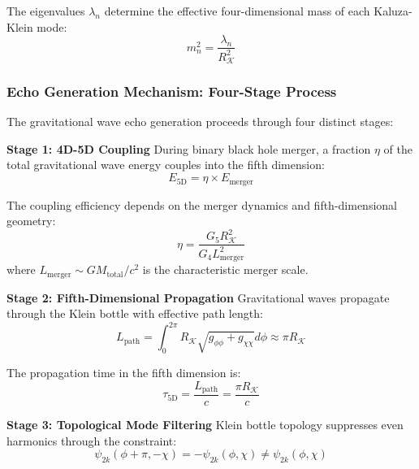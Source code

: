 \documentclass[reprint,amsmath,amssymb,aps,prd]{revtex4-2}
\newcommand{\Klein}{\mathcal{K}}
\newcommand{\KleinRadius}{R_\Klein}
\begin{document}
The eigenvalues $\lambda_n$ determine the effective four-dimensional mass of each Kaluza-Klein mode:
\begin{equation}
m_n^2 = \frac{\lambda_n}{\KleinRadius^2}
\label{eq:kk_mass}
\end{equation}

\subsubsection{Echo Generation Mechanism: Four-Stage Process}

The gravitational wave echo generation proceeds through four distinct stages:

\textbf{Stage 1: 4D-5D Coupling}
During binary black hole merger, a fraction $\eta$ of the total gravitational wave energy couples into the fifth dimension:
\begin{equation}
E_{\text{5D}} = \eta \times E_{\text{merger}}
\label{eq:coupling_energy}
\end{equation}

The coupling efficiency depends on the merger dynamics and fifth-dimensional geometry:
\begin{equation}
\eta = \frac{G_5 \KleinRadius^2}{G_4 L_{\text{merger}}^2}
\label{eq:coupling_efficiency}
\end{equation}
where $L_{\text{merger}} \sim GM_{\text{total}}/c^2$ is the characteristic merger scale.

\textbf{Stage 2: Fifth-Dimensional Propagation}
Gravitational waves propagate through the Klein bottle with effective path length:
\begin{equation}
L_{\text{path}} = \int_0^{2\pi} \KleinRadius \sqrt{g_{\phi\phi} + g_{\chi\chi}} d\phi \approx \pi \KleinRadius
\label{eq:path_length}
\end{equation}

The propagation time in the fifth dimension is:
\begin{equation}
\tau_{\text{5D}} = \frac{L_{\text{path}}}{c} = \frac{\pi \KleinRadius}{c}
\label{eq:5d_propagation_time}
\end{equation}

\textbf{Stage 3: Topological Mode Filtering}
Klein bottle topology suppresses even harmonics through the constraint:
\begin{equation}
\psi_{2k}(\phi + \pi, -\chi) = -\psi_{2k}(\phi, \chi) \neq \psi_{2k}(\phi, \chi)
\label{eq:even_mode_suppression}
\end{equation}
\end{document}
